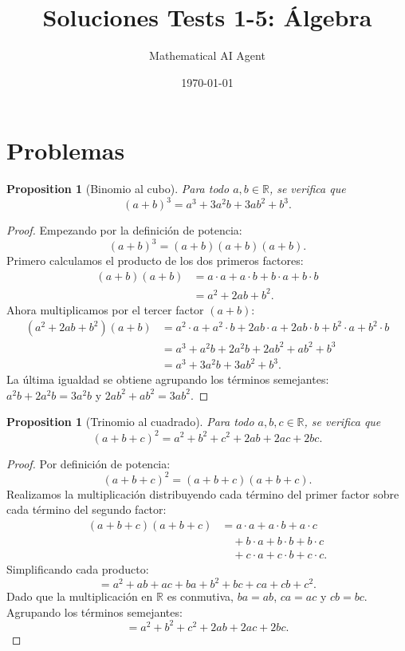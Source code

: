 \documentclass[11pt,a4paper]{article}
\title{Soluciones Tests 1-5: Álgebra}
\author{Mathematical AI Agent}
\date{\today}
\theoremstyle{plain}
\newtheorem{proposition}[theorem]{Proposition}
\theoremstyle{definition}
\begin{document}
\maketitle

\section{Problemas}

\begin{proposition}[Binomio al cubo]
Para todo $a, b \in \mathbb{R}$, se verifica que
\[
(a + b)^3 = a^3 + 3a^2b + 3ab^2 + b^3.
\]
\end{proposition}

\begin{proof}
Empezando por la definición de potencia:
\[
(a + b)^3 = (a + b)(a + b)(a + b).
\]
Primero calculamos el producto de los dos primeros factores:
\begin{align*}
(a + b)(a + b) &= a \cdot a + a \cdot b + b \cdot a + b \cdot b \\
               &= a^2 + 2ab + b^2.
\end{align*}
Ahora multiplicamos por el tercer factor $(a + b)$:
\begin{align*}
(a^2 + 2ab + b^2)(a + b) &= a^2 \cdot a + a^2 \cdot b + 2ab \cdot a + 2ab \cdot b + b^2 \cdot a + b^2 \cdot b \\
                          &= a^3 + a^2b + 2a^2b + 2ab^2 + ab^2 + b^3 \\
                          &= a^3 + 3a^2b + 3ab^2 + b^3.
\end{align*}
La última igualdad se obtiene agrupando los términos semejantes: $a^2b + 2a^2b = 3a^2b$ y $2ab^2 + ab^2 = 3ab^2$.
\end{proof}

\bigskip

\begin{proposition}[Trinomio al cuadrado]
Para todo $a, b, c \in \mathbb{R}$, se verifica que
\[
(a + b + c)^2 = a^2 + b^2 + c^2 + 2ab + 2ac + 2bc.
\]
\end{proposition}

\begin{proof}
Por definición de potencia:
\[
(a + b + c)^2 = (a + b + c)(a + b + c).
\]
Realizamos la multiplicación distribuyendo cada término del primer factor sobre cada término del segundo factor:
\begin{align*}
(a + b + c)(a + b + c) &= a \cdot a + a \cdot b + a \cdot c \\
                        &\quad + b \cdot a + b \cdot b + b \cdot c \\
                        &\quad + c \cdot a + c \cdot b + c \cdot c.
\end{align*}
Simplificando cada producto:
\[
= a^2 + ab + ac + ba + b^2 + bc + ca + cb + c^2.
\]
Dado que la multiplicación en $\mathbb{R}$ es conmutiva, $ba = ab$, $ca = ac$ y $cb = bc$. Agrupando los términos semejantes:
\[
= a^2 + b^2 + c^2 + 2ab + 2ac + 2bc.
\]
\end{proof}
\end{document}
